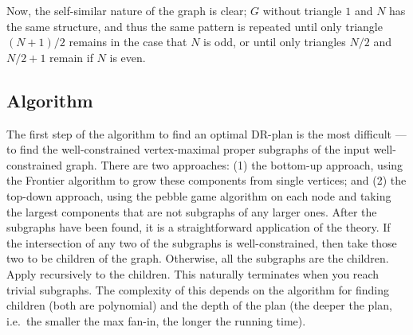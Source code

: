 Now, the self-similar nature of the graph is clear; $G$ without triangle $1$ and $N$ has the same structure, and thus the same pattern is repeated until only triangle $(N+1)/2$ remains in the case that $N$ is odd, or until only triangles $N/2$ and $N/2+1$ remain if $N$ is even.









\subsection{Algorithm}

The first step of the algorithm to find an optimal DR-plan is the most difficult --- to find the well-constrained vertex-maximal proper subgraphs of the input well-constrained graph. There are two approaches: (1) the bottom-up approach, using the Frontier algorithm \cite{Oung:2001:FFE:376957.376995} to grow these components from single vertices; and (2) the top-down approach, using the pebble game algorithm \cite{Jacobs:1997:PG} on each node and taking the largest components that are not subgraphs of any larger ones. After the subgraphs have been found, it is a straightforward application of the theory. If the intersection of any two of the subgraphs is well-constrained, then take those two to be children of the graph. Otherwise, all the subgraphs are the children. Apply recursively to the children. This naturally terminates when you reach trivial subgraphs. The complexity of this depends on the algorithm for finding children (both are polynomial) and the depth of the plan (the deeper the plan, i.e.\ the smaller the max fan-in, the longer the running time). 
